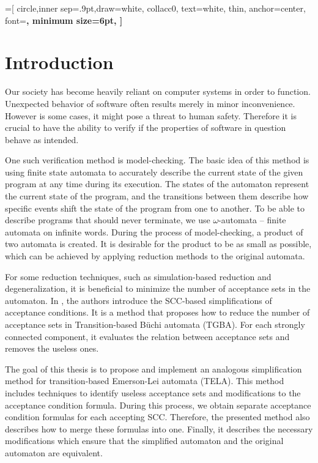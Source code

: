 \documentclass[
  digital, %
  twoside, %
  table,   %
  lof,     %
  lot,     %
]{fithesis3}
\begin{document}

=[
  circle,inner sep=.9pt,draw=white,
  collacc0, text=white,
  thin,
  anchor=center,
  font=\bfseries\sffamily\scriptsize,
  minimum size={6pt},
]

\chapter{Introduction}

Our society has become heavily reliant on computer systems in order to function. Unexpected behavior of software often results merely in minor inconvenience. However is some cases, it might pose a threat to human safety. Therefore it is crucial to have the ability to verify if the properties of software in question behave as intended. 

One such verification method is model-checking. The basic idea of this method is using finite state automata to accurately describe the current state of the given program at any time during its execution. The states of the automaton represent the current state of the program, and the transitions between them describe how specific events shift the state of the program from one to another. To be able to describe programs that should never terminate, we use $\omega$-automata -- finite automata on infinite words. During the process of model-checking, a product of two automata is created. It is desirable for the product to be as small as possible, which can be achieved by applying reduction methods to the original automata. 

For some reduction techniques, such as simulation-based reduction and degeneralization, it is beneficial to minimize the number of acceptance sets in the automaton. In \cite{spin2013}, the authors introduce the SCC-based simplifications of acceptance conditions. It is a method that proposes how to reduce the number of acceptance sets in Transition-based Büchi automata (TGBA). For each strongly connected component, it evaluates the relation between acceptance sets and removes the useless ones. 

The goal of this thesis is to propose and implement an analogous simplification method for transition-based Emerson-Lei automata (TELA).  This method includes techniques to identify useless acceptance sets and modifications to the acceptance condition formula. During this process, we obtain separate acceptance condition formulas for each accepting SCC. Therefore, the presented method also describes how to merge these formulas into one. Finally, it describes the necessary modifications which ensure that the simplified automaton and the original automaton are equivalent.
\end{document}
